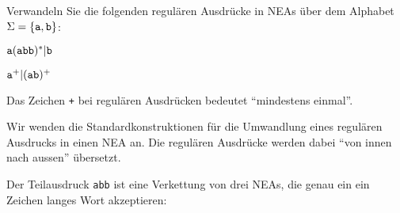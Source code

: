 Verwandeln Sie die folgenden regulären Ausdrücke in NEAs über
dem Alphabet $\Sigma =\{{\tt a},{\tt b}\}$:
\begin{teilaufgaben}
\item ${\tt a}({\tt abb})^*| {\tt b}$
\item ${\tt a}^+|({\tt ab})^+$
\end{teilaufgaben}

\begin{hinweis}
Das Zeichen {\tt +} bei regulären Ausdrücken bedeutet
``mindestens einmal''.
\end{hinweis}


\begin{loesung}
Wir wenden die Standardkonstruktionen für die Umwandlung eines regulären
Ausdrucks in einen NEA an. Die regulären Ausdrücke werden dabei
``von innen nach aussen'' übersetzt.
\def\zustand#1{
	\draw #1 circle[radius=0.2];
}
\def\akzeptierzustand#1{
	\zustand{#1}
	\draw #1 circle[radius=0.15];
}
\def\pfeil#1#2#3{
	\draw[->,shorten >= 0.2cm,shorten <= 0.2cm] #1 -- #2;
	\node at ($0.5*#1+0.5*#2$) [above] {#3};
}
\begin{teilaufgaben}
\item
\def\l{1.3}
\def\punkte{
	\coordinate (q0) at (0,0);
	\coordinate (q1) at (\l,0);
	\coordinate (q2) at ({2*\l},0);
	\coordinate (q3) at ({3*\l},0);
	\coordinate (q4) at ({4*\l},0);
	\coordinate (q5) at ({5*\l},0);
	\coordinate (qa) at ({-\l},0);
	\coordinate (qb) at ({-2*\l},0);
	\coordinate (qc) at ({-3*\l},0);
	\coordinate (z0) at ({-4*\l},-\l);
	\coordinate (z1) at ({-3*\l},{-2*\l});
	\coordinate (z2) at ({-2*\l},{-2*\l});
}
Der Teilausdruck {\tt abb} ist eine Verkettung von drei NEAs, die
genau ein ein Zeichen langes Wort akzeptieren:
\begin{center}
\end{center}

\end{teilaufgaben}
\end{loesung}
